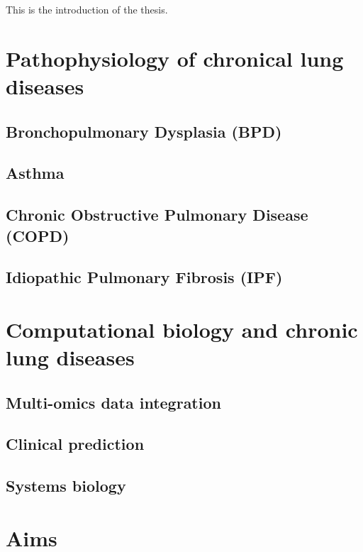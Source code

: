 This is the introduction of the thesis.

\section{Pathophysiology of chronical lung diseases}
    \subsection{Bronchopulmonary Dysplasia (BPD)}
    \subsection{Asthma}
    \subsection{Chronic Obstructive Pulmonary Disease (COPD)}
    \subsection{Idiopathic Pulmonary Fibrosis (IPF)}

\section{Computational biology and chronic lung diseases}
    \subsection{Multi-omics data integration}
    \subsection{Clinical prediction}
    \subsection{Systems biology}
    
\section{Aims}
